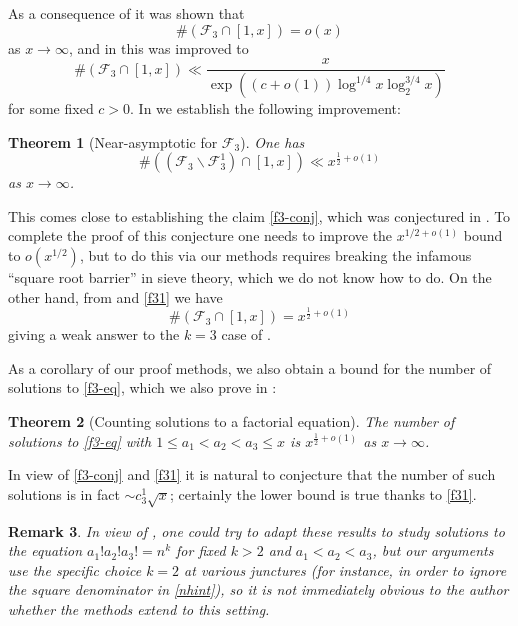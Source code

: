 \documentclass[12pt]{amsart}
\newtheorem{theorem}{Theorem}[section]
\newtheorem{remark}[theorem]{Remark}
\begin{document}
As a consequence of \cite[Theorem 2]{erdos-graham} it was shown that
$$ \# ({\mathcal F}_3 \cap [1,x]) = o(x)$$
as $x \to\infty$, and in \cite[Theorem 1]{luca} this was improved to
$$
\# ({\mathcal F}_3 \cap [1,x]) \ll \frac{x}{\exp((c+o(1)) \log^{1/4} x \log_2^{3/4} x)}
$$
for some fixed $c>0$.  In  we establish the following improvement:

\begin{theorem}[Near-asymptotic for ${\mathcal F}_3$]\label{f3-thm}  One has
$$   \#(({\mathcal F}_3 \backslash {\mathcal F}_3^1) \cap [1,x]) \ll x^{\frac{1}{2}+o(1)}$$
as $x \to \infty$.
\end{theorem}

This comes close to establishing the claim \eqref{f3-conj}, which was conjectured in \cite[p. 346]{erdos-graham}.  To complete the proof of this conjecture one needs to improve the $x^{1/2+o(1)}$ bound to $o(x^{1/2})$, but to do this via our methods requires breaking the infamous ``square root barrier'' in sieve theory, which we do not know how to do.  On the other hand, from  and \eqref{f31} we have
$$\#({\mathcal F}_3 \cap [1,x]) = x^{\frac{1}{2}+o(1)}$$
giving a weak answer to the $k=3$ case of \cite[Problem \#374]{bloom}.

As a corollary of our proof methods, we also obtain a bound for the number of solutions to \eqref{f3-eq}, which we also prove in :

\begin{theorem}[Counting solutions to a factorial equation]\label{thm-f3-eq}  The number of solutions to \eqref{f3-eq} with $1 \leq a_1 < a_2 < a_3 \leq x$ is $x^{\frac{1}{2}+o(1)}$ as $x \to \infty$.
\end{theorem}

In view of \eqref{f3-conj} and \eqref{f31} it is natural to conjecture that the number of such solutions is in fact $\sim c_3^1 \sqrt{x}$; certainly the lower bound is true thanks to \eqref{f31}.

\begin{remark} In view of \cite{berczes}, one could try to adapt these results to study solutions to the equation $a_1! a_2! a_3! = n^k$ for fixed $k > 2$ and $a_1 < a_2 < a_3$, but our arguments use the specific choice $k=2$ at various junctures (for instance, in order to ignore the square denominator in \eqref{nhint}), so it is not immediately obvious to the author whether the methods extend to this setting.
\end{remark}
\end{document}
